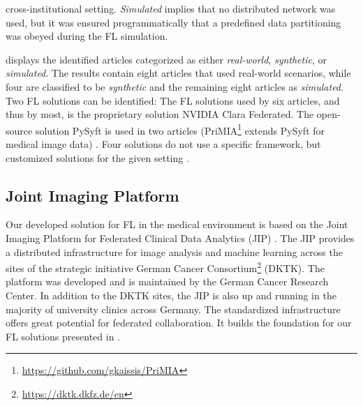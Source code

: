 cross-institutional setting.
\textit{Simulated} implies that no distributed network was used, but it was ensured programmatically that a predefined data partitioning was obeyed during the FL simulation.

 displays the identified articles categorized as either \textit{real-world}, \textit{synthetic}, or \textit{simulated}. The results contain eight articles that used real-world scenarios, while four are classified to be \textit{synthetic} and the remaining eight articles as \textit{simulated}.
Two FL solutions can be identified: The FL solutions used by six articles, and thus by most, is the proprietary solution NVIDIA Clara Federated\cite{Wang2020AutomatedLearning, Roth2020FederatedImplementation, Sarma2021FederatedSharing, Yang2021FederatedJapan, Li2019Privacy-preservingSegmentation, Flores2021FederatedPatients}. The open-source solution PySyft is used in two articles (PriMIA\footnote{\url{https://github.com/gkaissis/PriMIA}} extends PySyft for medical image data) \citep{Kaissis2021End-to-endImaging, Lee2021FederatedEnvironment}.  
Four solutions do not use a specific framework, but customized solutions for the given setting \cite{Xu2020ADiagnosis, Remedios2020DistributedSegmentation, Remedios2019DistributedInjury, Dou2021FederatedStudy}.



\subsection{Joint Imaging Platform}
\label{subsec:JIP}

Our developed solution for FL in the medical environment is based on the Joint Imaging Platform for Federated Clinical Data Analytics (JIP) \citep{Scherer2020JointAnalytics}.
The JIP provides a distributed infrastructure for image analysis and machine learning across the sites of the strategic initiative German Cancer Consortium\footnote{\url{https://dktk.dkfz.de/en}} (DKTK). The platform was developed and is maintained by the German Cancer Research Center. In addition to the DKTK sites, the JIP is also up and running in the majority of university clinics across Germany. The standardized infrastructure offers great potential for federated collaboration. It builds the foundation for our FL solutions presented in .

